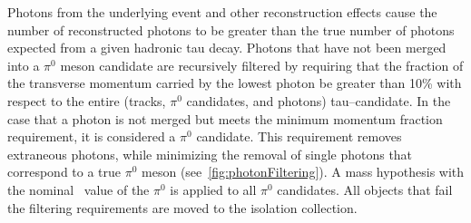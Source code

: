 Photons from the underlying event and other reconstruction effects cause the
number of reconstructed photons to be greater than the true number of photons
expected from a given hadronic tau decay.  Photons that have not been merged into
a $\pi^0$ meson candidate are recursively filtered by requiring that the
fraction of the transverse momentum carried by the lowest \pt photon be
greater than 10\% with respect to the entire (tracks, $\pi^0$ candidates, and
photons) tau--candidate. In the case that a photon is not merged but meets the
minimum momentum fraction requirement, it is considered a $\pi^0$
candidate.  This requirement removes extraneous photons, while minimizing the
removal of single photons that correspond to a true $\pi^0$ meson
(see~\ref{fig:photonFiltering}). A mass hypothesis with the
nominal~\cite{PDG} value of the $\pi^0$ is applied to all $\pi^0$ candidates.
All objects that fail the filtering requirements are moved to the isolation
collection.

